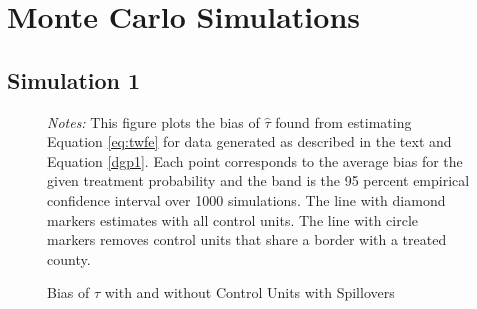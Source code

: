\documentclass[11pt]{article}
\begin{document}
\section{Monte Carlo Simulations}

\subsection{Simulation 1}

\begin{figure}[t]
    \caption{Bias of $\hat{\tau}$ with and without Control Units with Spillovers}
    \label{fig:bias_as_treat_prob}
    {\centering
    }

    {\footnotesize
        \textit{Notes:} This figure plots the bias of $\hat{\tau}$ found from estimating Equation \ref{eq:twfe} for data generated as described in the text and Equation \ref{dgp1}. Each point corresponds to the average bias for the given treatment probability and the band is the 95 percent empirical confidence interval over 1000 simulations. The line with diamond markers estimates with all control units. The line with circle markers removes control units that share a border with a treated county. 
    }
\end{figure}
\end{document}
